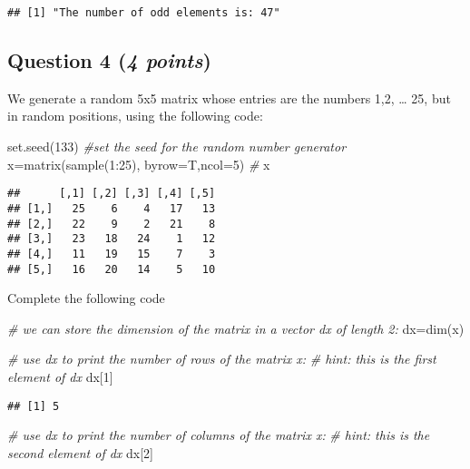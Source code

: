 \documentclass[
]{article}
\newenvironment{Shaded}{\begin{snugshade}}{\end{snugshade}}
\newcommand{\AttributeTok}[1]{\textcolor[rgb]{0.77,0.63,0.00}{#1}}
\newcommand{\CommentTok}[1]{\textcolor[rgb]{0.56,0.35,0.01}{\textit{#1}}}
\newcommand{\DecValTok}[1]{\textcolor[rgb]{0.00,0.00,0.81}{#1}}
\newcommand{\FunctionTok}[1]{\textcolor[rgb]{0.00,0.00,0.00}{#1}}
\newcommand{\NormalTok}[1]{#1}
\newcommand{\OtherTok}[1]{\textcolor[rgb]{0.56,0.35,0.01}{#1}}
\newcommand{\SpecialCharTok}[1]{\textcolor[rgb]{0.00,0.00,0.00}{#1}}
\begin{document}
\begin{verbatim}
## [1] "The number of odd elements is: 47"
\end{verbatim}

\hypertarget{question-4-4-points}{%
\subsection{\texorpdfstring{Question 4 (\emph{4
points})}{Question 4 (4 points)}}\label{question-4-4-points}}

We generate a random 5x5 matrix whose entries are the numbers 1,2,
\ldots{} 25, but in random positions, using the following code:

\begin{Shaded}
\begin{Highlighting}[]
\FunctionTok{set.seed}\NormalTok{(}\DecValTok{133}\NormalTok{) }\CommentTok{\#set the seed for the random number generator}
\NormalTok{x}\OtherTok{=}\FunctionTok{matrix}\NormalTok{(}\FunctionTok{sample}\NormalTok{(}\DecValTok{1}\SpecialCharTok{:}\DecValTok{25}\NormalTok{), }\AttributeTok{byrow=}\NormalTok{T,}\AttributeTok{ncol=}\DecValTok{5}\NormalTok{) }\CommentTok{\#}
\NormalTok{x}
\end{Highlighting}
\end{Shaded}

\begin{verbatim}
##      [,1] [,2] [,3] [,4] [,5]
## [1,]   25    6    4   17   13
## [2,]   22    9    2   21    8
## [3,]   23   18   24    1   12
## [4,]   11   19   15    7    3
## [5,]   16   20   14    5   10
\end{verbatim}

Complete the following code

\begin{Shaded}
\begin{Highlighting}[]
\CommentTok{\# we can store the dimension of the matrix in a vector dx of length 2:}
\NormalTok{dx}\OtherTok{=}\FunctionTok{dim}\NormalTok{(x)}

\CommentTok{\# use dx to print the number of rows of the matrix x:}
\CommentTok{\# hint: this is the first element of dx}
\NormalTok{dx[}\DecValTok{1}\NormalTok{]}
\end{Highlighting}
\end{Shaded}

\begin{verbatim}
## [1] 5
\end{verbatim}

\begin{Shaded}
\begin{Highlighting}[]
\CommentTok{\# use dx to print the number of columns of the matrix x:}
\CommentTok{\# hint: this is the second element of dx}
\NormalTok{dx[}\DecValTok{2}\NormalTok{]}
\end{Highlighting}
\end{Shaded}
\end{document}
